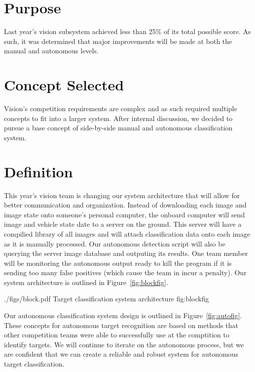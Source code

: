 \documentclass[]{auvsi_doc}
\begin{document}
\begin{AUVSITitlePage}
\begin{artifacttable}
\end{artifacttable}
\end{AUVSITitlePage}

\section{Purpose}

Last year's vision subsystem achieved less than 25\% of its total possible score. As such, it was determined that major improvements will be made at both the manual and autonomous levels.

\section{Concept Selected}

Vision's competition requirements are complex and as such required multiple concepts to fit into a larger system. After internal discussion, we decided to pursue a base concept of side-by-side manual and autonomous classification system.

\section{Definition}

This year's vision team is changing our system architecture that will allow for better
communication and organization. Instead of downloading each image and image state
onto someone's personal computer, the onboard computer will send image and vehicle state
date to a server on the ground. This server will have a compilied library of all images
and will attach classification data onto each image as it is manually processed. Our 
autonomous detection script will also be querying the server image database and outputing
its results. One team member will be monitoring the autonomous output ready to kill the 
program if it is sending too many false positives (which cause the team in incur a 
penalty). Our system architecture is outlined in Figure~\ref{fig:blockfig}.

\AUVSIFigure
{./figs/block.pdf}
{\textwidth}
{Target classification system architecture}
{fig:blockfig}

Our autonomous classification system design is outlined in Figure~\ref{fig:autofig}.
These concepts for autonomous target recognition are based on methods that
other competition teams were able to successfully use at the comptition to
identify targets. We will continue to iterate on the autonomous process, but
we are confident that we can create a reliable and robust system for autonomous
target classification.
\end{document}
